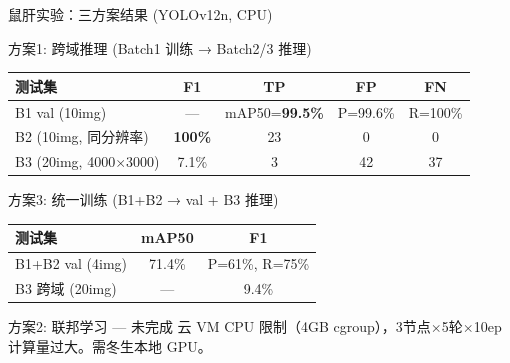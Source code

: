 \documentclass[aspectratio=169, 10pt]{beamer}
\begin{document}
\begin{frame}{鼠肝实验：三方案结果 (YOLOv12n, CPU)}
  \begin{alertblock}{方案1: 跨域推理 (Batch1 训练 → Batch2/3 推理)}
    \begin{tabular}{lcccc}
      \toprule
      \textbf{测试集} & \textbf{F1} & \textbf{TP} & \textbf{FP} & \textbf{FN} \\
      \midrule
      B1 val (10img) & — & mAP50=\textbf{99.5\%} & P=99.6\% & R=100\% \\
      B2 (10img, 同分辨率) & \textbf{100\%} & 23 & 0 & 0 \\
      B3 (20img, 4000$\times$3000) & 7.1\% & 3 & 42 & 37 \\
      \bottomrule
    \end{tabular}
  \end{alertblock}
  \vspace{0em}
  \begin{block}{方案3: 统一训练 (B1+B2 → val + B3 推理)}
    \begin{tabular}{lcc}
      \toprule
      \textbf{测试集} & \textbf{mAP50} & \textbf{F1} \\
      \midrule
      B1+B2 val (4img) & 71.4\% & P=61\%, R=75\% \\
      B3 跨域 (20img) & — & 9.4\% \\
      \bottomrule
    \end{tabular}
  \end{block}
  \vspace{0em}
  \begin{block}{方案2: 联邦学习 — 未完成}
    云 VM CPU 限制（4GB cgroup），3节点$\times$5轮$\times$10ep 计算量过大。需冬生本地 GPU。
  \end{block}
\end{frame}
\end{document}

